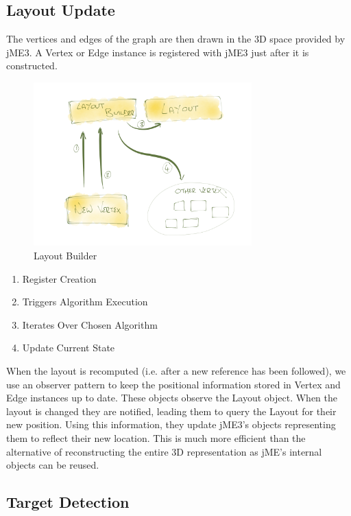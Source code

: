\documentclass[11pt, a4paper]{report}
\begin{document}
\subsection{Layout Update}

The vertices and edges of the graph are then drawn in the 3D space provided by jME3. A Vertex or Edge instance is registered with jME3 just after it is constructed.

\begin{figure}[h]
        \centering
        \includegraphics[width=0.75\textwidth]{images/final/builder.png}
        \caption{Layout Builder}
\end{figure}

\begin{enumerate}

  \item Register Creation
  \item Triggers Algorithm Execution
  \item Iterates Over Chosen Algorithm
  \item Update Current State

\end{enumerate}

When the layout is recomputed (i.e. after a new reference has been followed), we use an observer pattern to keep the positional information stored in Vertex and Edge instances up to date. These objects observe the Layout object. When the layout is changed they are notified, leading them to query the Layout for their new position. Using this information, they update jME3’s objects representing them to reflect their new location. This is much more efficient than the alternative of reconstructing the entire 3D representation as jME’s internal objects can be reused.

\subsection{Target Detection}
	 	 	 	 	
\end{document}
